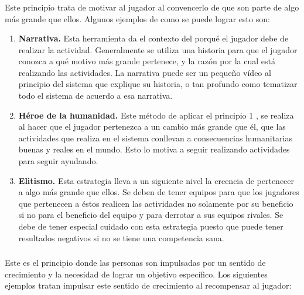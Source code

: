     \subsubsection{\principioI}
    \label{subsec:principioI}
  
    Este principio trata de motivar al jugador al convencerlo de que son parte de algo más grande que ellos.\cite[p. 66]{libro2} Algunos ejemplos de como se puede lograr esto son:
    
    \begin{enumerate}
    
        \item \textbf{Narrativa.} Esta herramienta da el contexto del porqué el jugador debe de realizar la actividad. Generalmente se utiliza una historia para que el jugador conozca a qué motivo más grande pertenece, y la razón por la cual está realizando las actividades. La narrativa puede ser un pequeño vídeo al principio del sistema que explique su historia, o tan profundo como tematizar todo el sistema de acuerdo a esa narrativa.\cite[p. 81]{libro2}
        
        \item \textbf{Héroe de la humanidad.} Este método de aplicar el principio 1 \principioI, se realiza al hacer que el jugador pertenezca a un cambio más grande que él, que las actividades que realiza en el sistema conllevan a consecuencias humanitarias buenas y reales en el mundo. Esto lo motiva a seguir realizando actividades para seguir ayudando.\cite[p. 82]{libro2}
        
        \item \textbf{Elitismo.} Esta estrategia lleva a un siguiente nivel la creencia de pertenecer a algo más grande que ellos. Se deben de tener equipos para que los jugadores que pertenecen a éstos realicen las actividades no solamente por su beneficio si no para el beneficio del equipo y para derrotar a sus equipos rivales. Se debe de tener especial cuidado con esta estrategia puesto que puede tener resultados negativos si no se tiene una competencia sana.\cite[p. 83]{libro2}
    
    \end{enumerate}
    
    \subsubsection{\principioII}
    \label{subsec:principioII}
    
    Este es el principio donde las personas son impulsadas por un sentido de crecimiento y la necesidad de lograr un objetivo específico.\cite[p. 91]{libro2} Los siguientes ejemplos tratan impulsar este sentido de crecimiento al recompensar al jugador:
    
